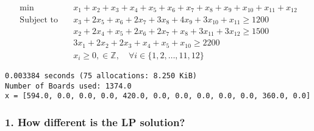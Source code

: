     
\begin{equation*}
\begin{split}
     \min\quad & x_{1} + x_{2} + x_{3} + x_{4} + x_{5} + x_{6} + x_{7} + x_{8} + x_{9} + x_{10} + x_{11} + x_{12}\\
\text{Subject to} \quad & x_{3} + 2 x_{5} + x_{6} + 2 x_{7} + 3 x_{8} + 4 x_{9} + 3 x_{10} + x_{11} \geq 1200\\
 & x_{2} + 2 x_{4} + x_{5} + 2 x_{6} + 2 x_{7} + x_{8} + 3 x_{11} + 3 x_{12} \geq 1500\\
 & 3 x_{1} + 2 x_{2} + 2 x_{3} + x_{4} + x_{5} + x_{10} \geq 2200\\
 & x_{i} \geq 0, \in \mathbb{Z}, \quad\forall i \in \{1,2,\dots,11,12\}
\end{split}
\end{equation*}

    
    \begin{Verbatim}[commandchars=\\\{\}]
  0.003384 seconds (75 allocations: 8.250 KiB)
Number of Boards used: 1374.0
x = [594.0, 0.0, 0.0, 0.0, 420.0, 0.0, 0.0, 0.0, 0.0, 0.0, 360.0, 0.0]

    \end{Verbatim}

    \hypertarget{how-different-is-the-lp-solution}{%
\subsubsection{1. How different is the LP
solution?}\label{how-different-is-the-lp-solution}}


